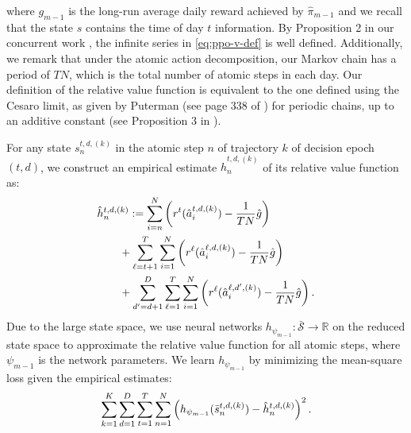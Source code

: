 where $g_{m-1}$ is the long-run average daily reward achieved by $\hat{\pi}_{m-1}$ and we recall that the state $s$ contains the time of day $t$ information. By Proposition 2 in our concurrent work \cite{dai2025optimal}, the infinite series in \eqref{eq:ppo-v-def} is well defined. Additionally, we remark that under the atomic action decomposition, our Markov chain has a period of $TN$, which is the total number of atomic steps in each day. Our definition of the relative value function is equivalent to the one defined using the Cesaro limit, as given by Puterman (see page 338 of \cite{PutermanMDP}) for periodic chains, up to an additive constant (see Proposition 3 in \cite{dai2025optimal}).

For any state $s^{t,d,(k)}_n$ in the atomic step $n$ of trajectory $k$ of decision epoch $(t, d)$, we construct an empirical estimate $\hat{h}^{t,d,(k)}_n$ of its relative value function as:
\begin{align} \label{eq:ppo-v-mc}
    &\hat{h}^{t,d, (k)}_{n} := \sum_{i = n}^{N} \left(r^t(\hat{a}^{t,d, (k)}_{i}) - \frac{1}{TN}\hat{g}\right) \notag \\
    &\qquad+ \sum_{\ell = t + 1}^{T} \sum_{i = 1}^{N} \left( r^{\ell}(\hat{a}^{\ell,d, (k)}_{i}) - \frac{1}{TN}\hat{g} \right) \notag \\
    &\qquad+ \sum_{d' = d + 1}^{D} \sum_{\ell = 1}^{T} \sum_{i = 1}^{N} \left( r^{\ell}(\hat{a}^{\ell,d', (k)}_{i}) - \frac{1}{TN}\hat{g} \right).
\end{align} 
Due to the large state space, we use neural networks $h_{\psi_{m-1}}: \bar{\mathcal{S}} \rightarrow \mathbb{R}$ on the reduced state space to approximate the relative value function for all atomic steps, where $\psi_{m-1}$ is the network parameters. 
We learn $h_{\psi_{m-1}}$ by minimizing the mean-square loss given the empirical estimates:
\begin{equation} \label{eq:ppo-v-norm}
    \sum_{k = 1}^K \sum_{d = 1}^{D} \sum_{t = 1}^{T} \sum_{n = 1}^{N} \left( h_{\psi_{m-1}}(\bar{s}^{t,d, (k)}_n) - \hat{h}^{t,d, (k)}_n\right)^2.
\end{equation}

